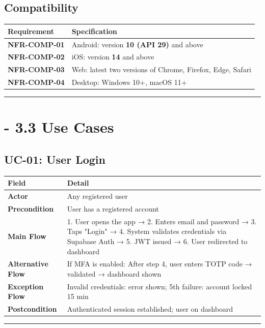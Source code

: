 \documentclass[journal, a4paper, onecolumn, 12pt]{IEEEtran}
\begin{document}
\subsection{Compatibility}

\begin{longtable}{|p{}|p{}|}
\hline
Requirement & Specification \\ \hline
\hline
\textbf{NFR-COMP-01} & Android: version \textbf{10 (API 29)} and above \\ \hline
\textbf{NFR-COMP-02} & iOS: version \textbf{14} and above \\ \hline
\textbf{NFR-COMP-03} & Web: latest two versions of Chrome, Firefox, Edge, Safari \\ \hline
\textbf{NFR-COMP-04} & Desktop: Windows 10+, macOS 11+ \\ \hline
\end{longtable}
\vspace{1em}\hrule\vspace{1em}

\section{    - 3.3 Use Cases}

\subsection{UC-01: User Login}

\begin{longtable}{|p{}|p{}|}
\hline
Field & Detail \\ \hline
\hline
\textbf{Actor} & Any registered user \\ \hline
\textbf{Precondition} & User has a registered account \\ \hline
\textbf{Main Flow} & 1. User opens the app → 2. Enters email and password → 3. Taps "Login" → 4. System validates credentials via Supabase Auth → 5. JWT issued → 6. User redirected to dashboard \\ \hline
\textbf{Alternative Flow} & If MFA is enabled: After step 4, user enters TOTP code → validated → dashboard shown \\ \hline
\textbf{Exception Flow} & Invalid credentials: error shown; 5th failure: account locked 15 min \\ \hline
\textbf{Postcondition} & Authenticated session established; user on dashboard \\ \hline
\end{longtable}
\vspace{1em}\hrule\vspace{1em}
\end{document}
